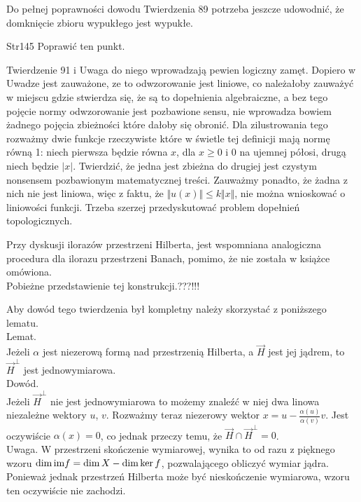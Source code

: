 \documentclass[a4paper,11pt]{article}
\begin{document}
\vspace{\spaceFour}


\start {} Do pełnej poprawności dowodu Twierdzenia 89 potrzeba
jeszcze udowodnić, że domknięcie zbioru wypukłego jest wypukłe.

\vspace{\spaceFour}


\start Str{145} Poprawić ten punkt.

\vspace{\spaceFour}


\start {} Twierdzenie 91 i Uwaga do niego wprowadzają pewien
logiczny zamęt. Dopiero w Uwadze jest zauważone, ze to odwzorowanie
jest liniowe, co należałoby zauważyć w miejscu gdzie stwierdza się, że
są to dopełnienia algebraiczne, a bez tego pojęcie normy odwzorowanie
jest pozbawione sensu, nie wprowadza bowiem żadnego pojęcia zbieżności
które dałoby się obronić. Dla zilustrowania tego rozważmy dwie funkcje
rzeczywiste które w świetle tej definicji mają normę równą 1: niech
pierwsza będzie równa $x$, dla $x \geq 0$ i 0 na ujemnej półosi, drugą
niech będzie $| x |$. Twierdzić, że jedna jest zbieżna do drugiej jest
czystym nonsensem pozbawionym matematycznej treści. Zauważmy ponadto,
że żadna z nich nie jest liniowa, więc z faktu, że
$\Vert u( x ) \Vert \leq k \Vert x \Vert$, nie można wnioskować o
liniowości funkcji. Trzeba szerzej przedyskutować problem dopełnień
topologicznych.

\vspace{\spaceFour}


\start {} Przy dyskusji ilorazów przestrzeni Hilberta, jest
wspomniana analogiczna procedura dla ilorazu przestrzeni Banach,
pomimo, że nie została w książce omówiona. \\
Pobieżne przedstawienie tej konstrukcji.???!!!

\vspace{\spaceFour}


\start {} Aby dowód tego twierdzenia był kompletny należy
skorzystać z poniższego lematu. \\
Lemat. \\
Jeżeli $\alpha$ jest niezerową formą nad przestrzenią Hilberta, a
$\vec{ H }$
jest jej jądrem, to $\vec{ H }^{ \bot }$ jest jednowymiarowa. \\
Dowód. \\
Jeżeli $\vec{ H }^{ \bot }$ nie jest jednowymiarowa to możemy znaleźć
w niej dwa linowa niezależne wektory $u$, $v$. Rozważmy teraz
niezerowy wektor $x = u -\frac{ \alpha( u ) }{ \alpha( v ) }v$. Jest
oczywiście $\alpha( x ) = 0$,
co jednak przeczy temu, że $\vec{ H } \cap \vec{ H }^{ \bot } =  0$. \\
Uwaga. W przestrzeni skończenie wymiarowej, wynika to od razu z
pięknego wzoru $\dim\textrm{im} f = \dim X - \dim\ker f$, pozwalającego
obliczyć wymiar jądra. Ponieważ jednak przestrzeń Hilberta może być
nieskończenie wymiarowa, wzoru ten oczywiście nie zachodzi.
\end{document}
